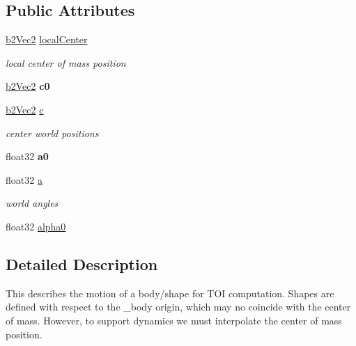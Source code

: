 \subsection*{Public Attributes}
\begin{DoxyCompactItemize}
\item 
\mbox{\label{structb2Sweep_a4bcc302cf78771896d6256fc53f2f8be}} 
\mbox{\hyperlink{structb2Vec2}{b2\+Vec2}} \mbox{\hyperlink{structb2Sweep_a4bcc302cf78771896d6256fc53f2f8be}{local\+Center}}
\begin{DoxyCompactList}\small\item\em local center of mass position \end{DoxyCompactList}\item 
\mbox{\label{structb2Sweep_a16dacd7188f3c7b2adef3242012587d8}} 
\mbox{\hyperlink{structb2Vec2}{b2\+Vec2}} {\bfseries c0}
\item 
\mbox{\label{structb2Sweep_a1b5402e01b92cc82473389fc6f0375c3}} 
\mbox{\hyperlink{structb2Vec2}{b2\+Vec2}} \mbox{\hyperlink{structb2Sweep_a1b5402e01b92cc82473389fc6f0375c3}{c}}
\begin{DoxyCompactList}\small\item\em center world positions \end{DoxyCompactList}\item 
\mbox{\label{structb2Sweep_acf89c7d1223f8ab27501ff033aeac92b}} 
float32 {\bfseries a0}
\item 
\mbox{\label{structb2Sweep_afa96bacc91dd3c92ae716a45512332d6}} 
float32 \mbox{\hyperlink{structb2Sweep_afa96bacc91dd3c92ae716a45512332d6}{a}}
\begin{DoxyCompactList}\small\item\em world angles \end{DoxyCompactList}\item 
float32 \mbox{\hyperlink{structb2Sweep_aa5f8ab90178b58bc0777096cbc6b91cf}{alpha0}}
\end{DoxyCompactItemize}


\subsection{Detailed Description}
This describes the motion of a body/shape for T\+OI computation. Shapes are defined with respect to the _body origin, which may no coincide with the center of mass. However, to support dynamics we must interpolate the center of mass position.

